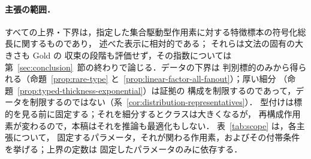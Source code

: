 \paragraph{主張の範囲．}
すべての上界・下界は，指定した集合駆動型作用素に対する特徴標本の符号化総長に関するものであり，
述べた表示に相対的である；
それらは文法の固有の大きさも Gold の
収束の段階も評価せず，その指数については
第~\ref{sec:conclusion}~節の終わりで論じる．データの下界は
判別標的のみから得られる（命題~\ref{prop:rare-type}
と~\ref{prop:linear-factor-all-fanout}）；厚い細分
（命題~\ref{prop:typed-thickness-exponential}）は証拠の
構成を制限するのであって，データを制限するのではない（系~\ref{cor:distribution-representatives}）．
型付けは標的を見る前に固定する；それを細分するとクラスは大きくなるが，
再構成作用素が変わるので，本稿はそれを推論も最適化もしない．
表~\ref{tab:scope} は，各主張について，
固定するパラメータ，それが関わる作用素，およびその付帯条件を挙げる；上界の定数は
固定したパラメータのみに依存する．

